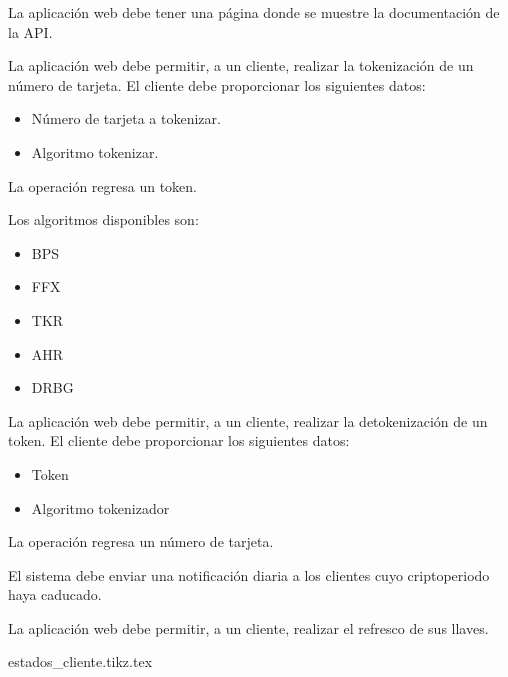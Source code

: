 {
  La aplicación web debe tener una página donde se muestre la documentación de la
  API.
}

{
  La aplicación web debe permitir, a un cliente, realizar la tokenización de un
  número de tarjeta. El cliente debe proporcionar los siguientes datos:
  \begin{itemize}
    \item Número de tarjeta a tokenizar.
    \item Algoritmo tokenizar.
  \end{itemize}
  La operación regresa un token.

  Los algoritmos disponibles son:
  \begin{itemize}
    \item BPS
    \item FFX
    \item TKR
    \item AHR
    \item DRBG
  \end{itemize}
}

{
  La aplicación web debe permitir, a un cliente, realizar la detokenización de
  un token. El cliente debe proporcionar los siguientes datos:
  \begin{itemize}
    \item Token
    \item Algoritmo tokenizador
  \end{itemize}
  La operación regresa un número de tarjeta.
}

{
  El sistema debe enviar una notificación diaria a los clientes cuyo
  criptoperiodo haya caducado.
}

{
  La aplicación web debe permitir, a un cliente, realizar el refresco de sus
  llaves.
}

\begin{sidewaysfigure}
  \begin{center}
    {estados_cliente.tikz.tex}
    \caption{Diagrama de estados de un cliente.}
    \label{estados_cliente}
  \end{center}
\end{sidewaysfigure}
